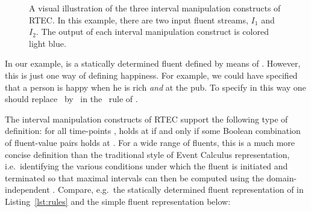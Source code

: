 \begin{figure}[tp]
\centering
{}
\caption{A visual illustration of the three interval manipulation constructs of RTEC. In this example, there are two input fluent streams, $I_1$ and $I_2$. The output of each interval manipulation construct is colored light blue.}
\label{fig:interval-manipulation}
\end{figure}


In our example,  is a statically determined fluent defined by means of \unionall. 
However, this is just one way of defining happiness. For example, we could have specified that a person is happy when he is rich \textit{and} at the pub. To specify  in this way one should replace \unionall\ by \intersectall\ in the \holdsFor\ rule of .

The interval manipulation constructs of RTEC support the following type of definition: for all time-points ,  holds at  if and only if some Boolean combination of fluent-value pairs holds at . For a wide range of fluents, this is a much more concise definition than the traditional style of Event Calculus representation, i.e.~identifying the various conditions under which the fluent is initiated and terminated so that maximal intervals can then be computed using the domain-independent \holdsFor. Compare, e.g.~the statically determined fluent representation of  in Listing~\ref{lst:rules} and the simple fluent representation below:

